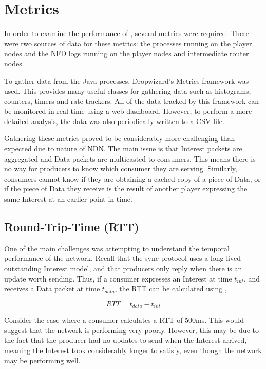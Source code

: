 \section{Metrics}\label{sec:impl:metrics}
In order to examine the performance of \game{}, several metrics were required. There were two sources of data for these metrics: the \game{} processes running on the player nodes and the NFD logs running on the player nodes and intermediate router nodes. 

To gather data from the \game{} Java processes, Dropwizard's Metrics framework \cite{dropwizard-metrics} was used. This provides many useful classes for gathering data such as histograms, counters, timers and rate-trackers. All of the data tracked by this framework can be monitored in real-time using a web dashboard. However, to perform a more detailed analysis, the data was also periodically written to a CSV file.


Gathering these metrics proved to be considerably more challenging than expected due to nature of NDN. The main issue is that Interest packets are aggregated and Data packets are multicasted to consumers. This means there is no way for producers to know which consumer they are serving. Similarly, consumers cannot know if they are obtaining a cached copy of a piece of Data, or if the piece of Data they receive is the result of another player expressing the same Interest at an earlier point in time. 

\subsection{Round-Trip-Time (RTT)}
One of the main challenges was attempting to understand the temporal performance of the network. Recall that the sync protocol uses a long-lived outstanding Interest model, and that producers only reply when there is an update worth sending. Thus, if a consumer expresses an Interest at time $t_{int}$, and receives a Data packet at time $t_{data}$, the RTT can be calculated using ,

\begin{equation}\label{eq:impl:rtt}
    RTT = t_{data} - t_{int}
\end{equation}

Consider the case where a consumer calculates a RTT of 500ms. This would suggest that the network is performing very poorly. However, this may be due to the fact that the producer had no updates to send when the Interest arrived,  meaning the Interest took considerably longer to satisfy, even though the network may be performing well.

